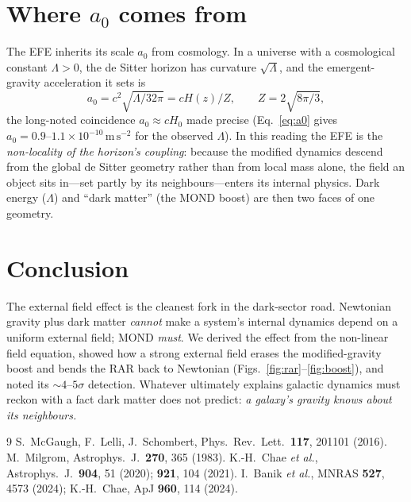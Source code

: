 \documentclass[aps,prd,twocolumn,10pt,nofootinbib]{revtex4-2}
\begin{document}
\section{Where $a_0$ comes from}
The EFE inherits its scale $a_0$ from cosmology. In a universe with a cosmological constant $\Lambda>0$, the de
Sitter horizon has curvature $\sqrt{\Lambda}$, and the emergent-gravity acceleration it sets is
\begin{equation}
a_0=c^2\sqrt{\Lambda/32\pi}=cH(z)/Z,\qquad Z=2\sqrt{8\pi/3},
\label{eq:a0}
\end{equation}
the long-noted coincidence $a_0\!\approx\!cH_0$ made precise (Eq.~\eqref{eq:a0} gives
$a_0\!=\!0.9\text{--}1.1\times10^{-10}\,\mathrm{m\,s^{-2}}$ for the observed $\Lambda$). In this reading the EFE
is the \emph{non-locality of the horizon's coupling}: because the modified dynamics descend from the global de
Sitter geometry rather than from local mass alone, the field an object sits in---set partly by its
neighbours---enters its internal physics. Dark energy ($\Lambda$) and ``dark matter'' (the MOND boost) are then
two faces of one geometry.

\section{Conclusion}
The external field effect is the cleanest fork in the dark-sector road. Newtonian gravity plus dark matter
\emph{cannot} make a system's internal dynamics depend on a uniform external field; MOND \emph{must}. We derived
the effect from the non-linear field equation, showed how a strong external field erases the modified-gravity
boost and bends the RAR back to Newtonian (Figs.~\ref{fig:rar}--\ref{fig:boost}), and noted its
$\sim\!4\text{--}5\sigma$ detection. Whatever ultimately explains galactic dynamics must reckon with a fact dark
matter does not predict: \emph{a galaxy's gravity knows about its neighbours.}

\begin{thebibliography}{9}
 S.~McGaugh, F.~Lelli, J.~Schombert, Phys.\ Rev.\ Lett.\ \textbf{117}, 201101 (2016).
 M.~Milgrom, Astrophys.\ J.\ \textbf{270}, 365 (1983).
 K.-H.~Chae \emph{et al.}, Astrophys.\ J.\ \textbf{904}, 51 (2020); \textbf{921}, 104 (2021).
 I.~Banik \emph{et al.}, MNRAS \textbf{527}, 4573 (2024); K.-H.~Chae, ApJ \textbf{960}, 114 (2024).
\end{thebibliography}
\end{document}
